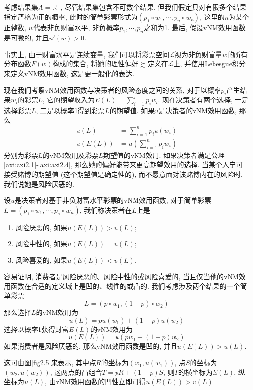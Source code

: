 \documentclass[cn, 12pt, math=mtpro2, bibstyle=apa, blue]{elegantbook}
\newcommand{\R}{\mathbb{R}}
\begin{document}
考虑结果集$A=\R_+$, 尽管结果集包含不可数个结果, 但我们假定只对有限多个结果指定严格为正的概率, 此时的简单彩票形式为$(p_1\circ w_1,\cdots,p_n\circ w_n)$, 这里的$n$为某个正整数, $w$代表非负财富水平, 非负概率$p_1,\cdots,p_n$之和为1. 最后, 假设vNM效用函数是可微的, 并且$u'(w)>0$.

\begin{remark}
事实上, 由于财富水平是连续变量, 我们可以将彩票空间$\mathscr{L}$视为非负财富量$w$的所有分布函数$F(w)$构成的集合, 将她的理性偏好$\succsim$定义在$\mathscr{L}$上, 并使用Lebesgue积分来定义vNM效用函数, 这是更一般化的表达.
\end{remark}

现在我们考察vNM效用函数与决策者的风险态度之间的关系, 对于以概率$p_i$产生结果$w_i$的彩票$L$, 它的期望收入为$E(L)=\sum_{i=1}^{n}p_iw_i$. 现在决策者有两个选择, 一是选择彩票$L$, 二是以概率1得到彩票$L$的期望值. 如果$u$是决策者的vNM效用函数, 那么
\begin{align*}
u(L)&=\sum_{i=1}^{n}p_iu(w_i) \\
u(E(L))&=u\left(\sum_{i=1}^{n}p_iw_i\right)
\end{align*}
分别为彩票$L$的vNM效用及彩票$L$期望值的vNM效用. 如果决策者满足公理\ref{axi:axi2.1}-\ref{axi:axi2.4}, 那么她的偏好能带来更高期望效用的选择. 当某个人宁可接受赌博的期望值 (这个期望值是确定性的), 而不愿意面对该赌博内在的风险时, 我们说她是风险厌恶的.

\begin{definition}[风险态度的分类]
设$u$是决策者对基于非负财富水平彩票的vNM效用函数, 对于简单彩票$L=(p_1\circ w_1,\cdots, p_n\circ w_n)$, 我们称决策者在$L$上是
\begin{enumerate}[\arabic*.]
  \item 风险厌恶的, 如果$u(E(L))>u(L)$;
  \item 风险中性的, 如果$u(E(L))=u(L)$;
  \item 风险喜爱的, 如果$u(E(L))<u(L)$.
\end{enumerate}
\end{definition}
容易证明, 消费者是风险厌恶的、风险中性的或风险喜爱的, 当且仅当他的vNM效用函数在合适的定义域上是凹的、线性的或凸的. 我们考虑涉及两个结果的一个简单彩票
$$L=(p\circ w_1,(1-p)\circ w_2)$$
那么选择$L$的vNM效用为
$$u(L)=pu(w_1)+(1-p)u(w_2)$$
选择以概率1获得财富$E(L)$的vNM效用为
$$u(E(L))=u(pw_1+(1-p)w_2)$$
如果消费者是风险厌恶的, 那么vNM效用函数是凹的, 并且$u(E(L))>u(L)$. 

这可由图\ref{fig2.5}来表示, 其中点$R$的坐标为$(w_1,u(w_1))$, 点$S$的坐标为$(w_2,u(w_2))$, 这两点的凸组合$T=pR+(1-p)S$, 则$T$的横坐标为$E(L)$, 纵坐标为$u(L)$, 由vNM效用函数的凹性立即可得$u(E(L))>u(L)$.
\end{document}
